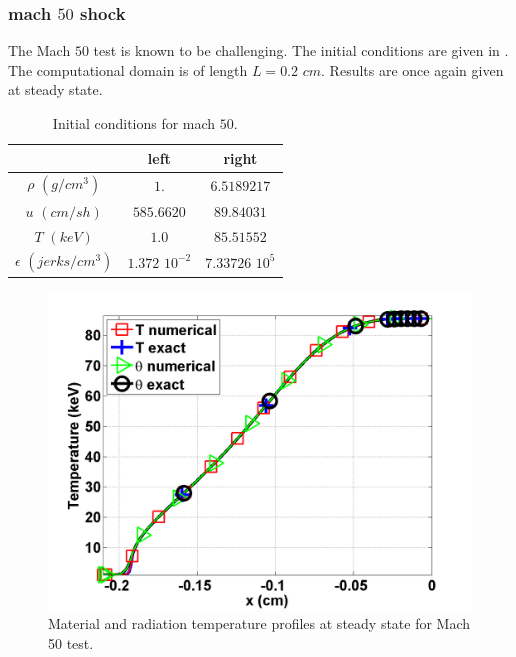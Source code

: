 \subsubsection{mach $50$ shock} 

The Mach $50$ test is known to be challenging. The initial conditions are given in . The computational domain is of length $L=0.2$ $cm$. Results are once again given at steady state.
\begin{table}[H]
\caption{\label{tbl:table7} Initial conditions for mach $50$.}
\begin{center}
\begin{tabular}{|c|c|c|}
\hline 
 & left  & right \\ \hline
$\rho$ $(g/cm^3)$ &$1.$ & $6.5189217$ \\ \hline
$u$ $(cm/sh)$& $585.6620$ & $89.84031$ \\ \hline
$T$ $(keV)$& $1.0$ & $85.51552$\\ \hline
$\epsilon$ $(jerks/cm^3)$ & $1.372$ $10^{-2}$ & $7.33726$ $10^{5}$\\
\hline
\end{tabular}  
\end{center}  
\end{table}
\begin{figure}[H]
                \centering
                \includegraphics[width=\textwidth]{figures/Mach_50_nel_1000_temperature.png}
        \caption{Material and radiation temperature profiles at steady state for Mach 50 test.}\label{fig:Mach50_temp}
\end{figure}
